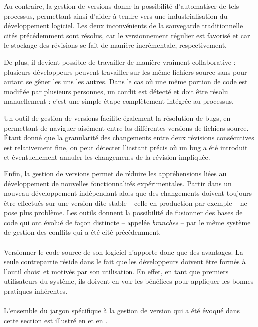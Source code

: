Au contraire, la gestion de versions donne la possibilité d'automatiser de tels processus, permettant ainsi d'aider à tendre vers une industrialisation du développement logiciel.
Les deux inconvénients de la sauvegarde traditionnelle cités précédemment sont résolus, car le versionnement régulier est favorisé et car le stockage des révisions se fait de manière incrémentale, respectivement.

De plus, il devient possible de travailler de manière vraiment collaborative : plusieurs développeurs peuvent travailler sur les même fichiers source sans pour autant se gêner les uns les autres.
Dans le cas où une même portion de code est modifiée par plusieurs personnes, un conflit est détecté et doit être résolu manuellement : c'est une simple étape complètement intégrée au processus.

Un outil de gestion de versions facilite également la résolution de bugs, en permettant de naviguer aisément entre les différentes versions de fichiers source.
Étant donné que la granularité des changements entre deux révisions consécutives est relativement fine, on peut détecter l'instant précis où un bug a été introduit et éventuellement annuler les changements de la révision impliquée.

Enfin, la gestion de versions permet de réduire les appréhensions liées au développement de nouvelles fonctionnalités expérimentales.
Partir dans un nouveau développement indépendant alors que des changements doivent toujours être effectués sur une version dite stable -- celle en production par exemple -- ne pose plus problème.
Les outils donnent la possibilité de fusionner des bases de code qui ont évolué de façon distincte -- appelée \emph{branches} -- par le même système de gestion des conflits qui a été cité précédemment.

\paragraph{}
Versionner le code source de son logiciel n'apporte donc que des avantages.
La seule contrepartie réside dans le fait que les développeurs doivent être formés à l'outil choisi et motivés par son utilisation.
En effet, en tant que premiers utilisateurs du système, ils doivent en voir les bénéfices pour appliquer les bonnes pratiques inhérentes.

\paragraph{}
L'ensemble du jargon spécifique à la gestion de version qui a été évoqué dans cette section est illustré en  et en .


